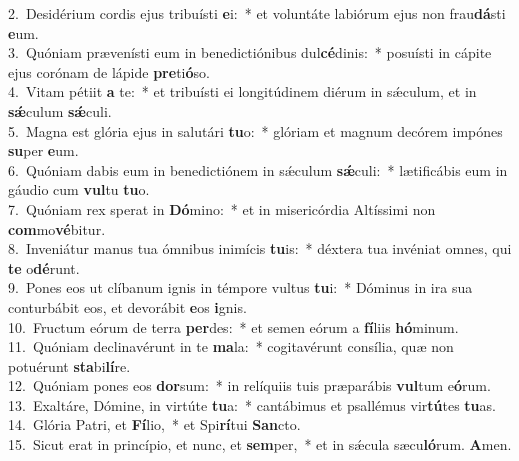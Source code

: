 {2.~}Desidérium cordis ejus tribuísti \textbf{e}i:~* et voluntáte labiórum ejus non frau\textbf{dá}sti \textbf{e}um.\\
{3.~}Quóniam prævenísti eum in benedictiónibus dul\textbf{cé}dinis:~* posuísti in cápite ejus corónam de lápide \textbf{pre}ti\textbf{ó}so.\\
{4.~}Vitam pétiit \textbf{a} te:~* et tribuísti ei longitúdinem diérum in sǽculum, et in \textbf{sǽ}culum \textbf{sǽ}culi.\\
{5.~}Magna est glória ejus in salutári \textbf{tu}o:~* glóriam et magnum decórem impónes \textbf{su}per \textbf{e}um.\\
{6.~}Quóniam dabis eum in benedictiónem in sǽculum \textbf{sǽ}culi:~* lætificábis eum in gáudio cum \textbf{vul}tu \textbf{tu}o.\\
{7.~}Quóniam rex sperat in \textbf{Dó}mino:~* et in misericórdia Altíssimi non \textbf{com}mo\textbf{vé}bitur.\\
{8.~}Inveniátur manus tua ómnibus inimícis \textbf{tu}is:~* déxtera tua invéniat omnes, qui \textbf{te} o\textbf{dé}runt.\\
{9.~}Pones eos ut clíbanum ignis in témpore vultus \textbf{tu}i:~* Dóminus in ira sua conturbábit eos, et devorábit \textbf{e}os \textbf{i}gnis.\\
{10.~}Fructum eórum de terra \textbf{per}des:~* et semen eórum a \textbf{fí}liis \textbf{hó}minum.\\
{11.~}Quóniam declinavérunt in te \textbf{ma}la:~* cogitavérunt consília, quæ non potuérunt \textbf{sta}bi\textbf{lí}re.\\
{12.~}Quóniam pones eos \textbf{dor}sum:~* in relíquiis tuis præparábis \textbf{vul}tum e\textbf{ó}rum.\\
{13.~}Exaltáre, Dómine, in virtúte \textbf{tu}a:~* cantábimus et psallémus vir\textbf{tú}tes \textbf{tu}as.\\
{14.~}Glória Patri, et \textbf{Fí}lio,~* et Spi\textbf{rí}tui \textbf{San}cto.\\
{15.~}Sicut erat in princípio, et nunc, et \textbf{sem}per,~* et in sǽcula sæcu\textbf{ló}rum. \textbf{A}men.\\
